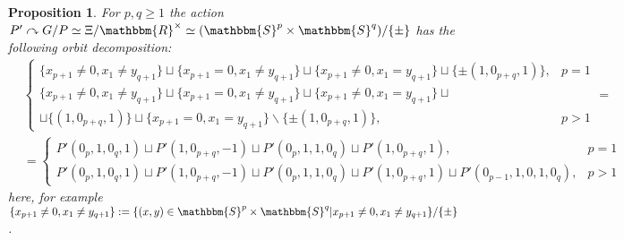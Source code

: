 \documentclass{article}
\newcommand{\assign}{:=}
\newtheorem{proposition}{Proposition}[section]
\theoremstyle{remark}
\begin{document}
\begin{proposition}
  \label{doublePGP:prop-orbitdeco}For $p, q \geqslant 1$ the action $P'
  \curvearrowright G / P \simeq \Xi /\mathbbm{R}^{\times} \simeq
  (\mathbbm{S}^p \times \mathbbm{S}^q) / \{ \pm \}$ has the following orbit
  decomposition:
  \begin{eqnarray}
    & \left\{ \begin{array}{ll}
      \{ x_{p + 1} \neq 0, x_1 \neq y_{q + 1} \} \sqcup \{ x_{p + 1} = 0, x_1
      \neq y_{q + 1} \} \sqcup \{ x_{p + 1} \neq 0, x_1 = y_{q + 1} \} \sqcup
      \{ \pm (1, 0_{p + q}, 1) \}, & p = 1\\
      \{ x_{p + 1} \neq 0, x_1 \neq y_{q + 1} \} \sqcup \{ x_{p + 1} = 0, x_1
      \neq y_{q + 1} \} \sqcup \{ x_{p + 1} \neq 0, x_1 = y_{q + 1} \} \sqcup
      & \\
      \sqcup \{ (1, 0_{p + q}, 1) \} \sqcup \{ x_{p + 1} = 0, x_1 = y_{q + 1}
      \} \backslash \{ \pm (1, 0_{p + q}, 1) \}, & p > 1
    \end{array} \right. = &  \nonumber\\
    & = \left\{ \begin{array}{ll}
      P' (0_p, 1, 0_q, 1) \sqcup P' (1, 0_{p + q}, - 1) \sqcup P' (0_p, 1, 1,
      0_q) \sqcup P' (1, 0_{p + q}, 1), & p = 1\\
      P' (0_p, 1, 0_q, 1) \sqcup P' (1, 0_{p + q}, - 1) \sqcup P' (0_p, 1, 1,
      0_q) \sqcup P' (1, 0_{p + q}, 1) \sqcup P' (0_{p - 1}, 1, 0, 1, 0_q), &
      p > 1
    \end{array} \right. &  \nonumber
  \end{eqnarray}
  here, for example $\{ x_{p + 1} \neq 0, x_1 \neq y_{q + 1} \} \assign \{ (x,
  y) \in \mathbbm{S}^p \times \mathbbm{S}^q | x_{p + 1} \neq 0, x_1 \neq y_{q
  + 1} \} / \{ \pm \}$.
\end{proposition}
\end{document}
